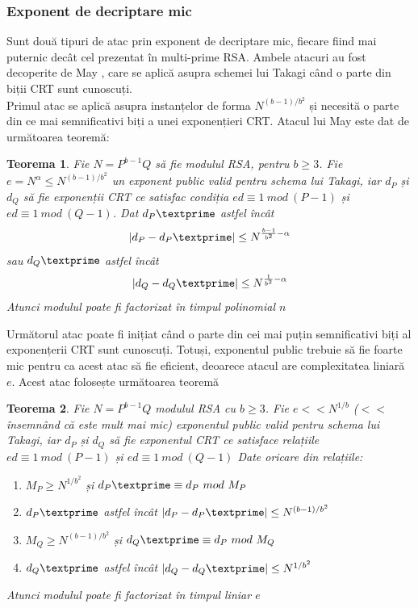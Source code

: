 \documentclass[12pt, oneside]{book}
\newtheorem{theorem}{Teorema}
\begin{document}
\subsubsection{Exponent de decriptare mic}
Sunt două tipuri de atac prin exponent de decriptare mic, fiecare fiind mai puternic decât cel prezentat în multi-prime RSA. Ambele atacuri au fost decoperite de May \cite{may}, care se aplică asupra schemei lui Takagi când o parte din biții CRT sunt cunoscuți. \\
Primul atac se aplică asupra instanțelor de forma $ N^{(b-1)/b^2}$ și necesită o parte din ce mai semnificativi biți a unei exponențieri CRT. Atacul lui May \cite{may} este dat de următoarea teoremă:
\begin{theorem}
Fie $N=P^{b-1}Q$ să fie modulul RSA, pentru $b \geqslant 3$. Fie $e= N^{\alpha} \leq N^{(b-1)/b^2}$ un exponent public valid pentru schema lui Takagi, iar $d_P$ și $d_Q$ să fie exponenții CRT ce satisfac condiția $ed \equiv 1 \ mod \ (P-1)$ și $ed \equiv 1 \ mod \ (Q-1)$. Dat $d_P \textprime$ astfel încât 
$$  \left| d_P - d_P \textprime \right| \leq N^{\frac{b-1}{b^2}- \alpha}  $$ 
sau $d_Q \textprime$ astfel încât 
$$ \left| d_Q - d_Q \textprime \right| \leq N^{\frac{1}{b^2}- \alpha} $$
Atunci modulul poate fi factorizat în timpul polinomial $n$
\end{theorem}
Următorul atac poate fi inițiat când o parte din cei mai puțin semnificativi biți al exponențerii CRT sunt cunoscuți. Totuși, exponentul public trebuie să fie foarte mic pentru ca acest atac să fie eficient, deoarece atacul are complexitatea liniară $e$. Acest atac folosește următoarea teoremă
\begin{theorem}
Fie $N=P^{b-1}Q$ modulul RSA cu $b \geqslant 3$. Fie $e << N^{1/b}$ ($<<$ însemnând că este mult mai mic) exponentul public valid pentru schema lui Takagi, iar $d_P$ și $d_Q$ să fie exponentul CRT ce satisface relațiile $ed \equiv 1 \ mod \ (P-1)$ și $ed \equiv 1 \ mod \ (Q-1)$ Date oricare din relațiile:
\begin{enumerate}
\item $  M_P \geqslant N^{1/b^2}$ și $d_P \textprime \equiv d_P \ mod \ M_P$
\item $d_P \textprime$ astfel încât $ \left| d_P - d_P \textprime \right| \leq N^{(b-1)/b^2}$
\item $M_Q \geqslant N^{(b-1)/b^2}$ și $d_Q \textprime \equiv d_P \ mod \ M_Q$
\item $d_Q \textprime$ astfel încât $ \left| d_Q - d_Q \textprime \right| \leq N^{1/b^2}$
\end{enumerate}
Atunci modulul poate fi factorizat în timpul liniar $e$
\end{theorem}
\clearpage
\end{document}
